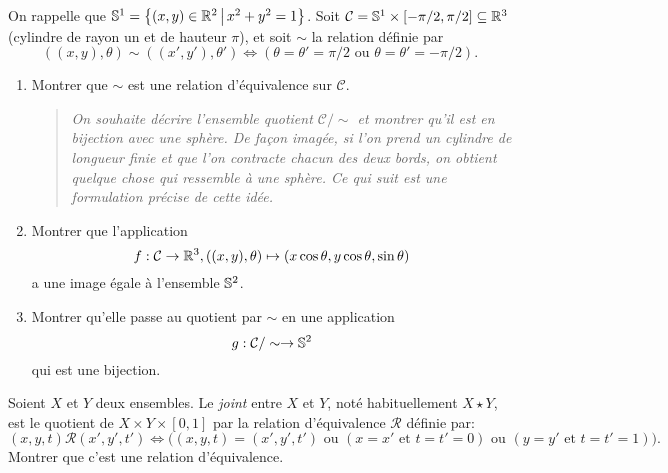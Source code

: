 \begin{exercice}
On rappelle que $\S^1 = \ensemble{(x,y)\in\R^2}{x^2+y^2=1}$.
Soit $\mathcal C=\S^1\times [-\pi/2,\pi/2] \subseteq \R^3$ (cylindre de rayon un et de hauteur $\pi$), et soit $\sim$ la relation définie par 
\[ ((x,y),\theta)\sim ((x',y'),\theta') \iff (\theta=\theta'=\pi/2\text{ ou } \theta=\theta'=-\pi/2).\]

\begin{enumerate}
\item Montrer que $\sim$ est une relation d'équivalence sur $\mathcal C$.
\begin{quote}
\emph{On souhaite décrire l'ensemble quotient $\mathcal C/\sim$ et montrer qu'il est en bijection avec une sphère. De façon imagée, si l'on prend un cylindre de longueur finie et que l'on contracte chacun des deux bords, on obtient quelque chose qui ressemble à une sphère. Ce qui suit est une formulation précise de cette idée.}
\end{quote}
\item Montrer que l'application 
\[ f : \mathcal C \to \R^3, ((x,y),\theta)\mapsto (x\cos\theta,y\cos\theta,\sin\theta) \]
a une image égale à l'ensemble $\S^2$.
\item Montrer qu'elle passe au quotient par $\sim$ en une application
\[ g : \mathcal C/\sim \to \S^2\]
qui est une bijection.
\end{enumerate}
\end{exercice}

\begin{exercice}
Soient $X$ et $Y$ deux ensembles. Le \emph{joint} entre $X$ et $Y$, noté habituellement $X\star Y$, est le quotient de $X\times Y\times [0,1]$ par la relation d'équivalence $\mathcal R$ définie par:
\[ (x,y,t)\mathcal R (x',y',t') \iff \big( (x,y,t)= (x',y',t')\text{ ou } (x=x'\text{ et }t=t'=0) \text{ ou } (y=y'\text{ et }t=t'=1)\big).\]
Montrer que c'est une relation d'équivalence.
\end{exercice}


